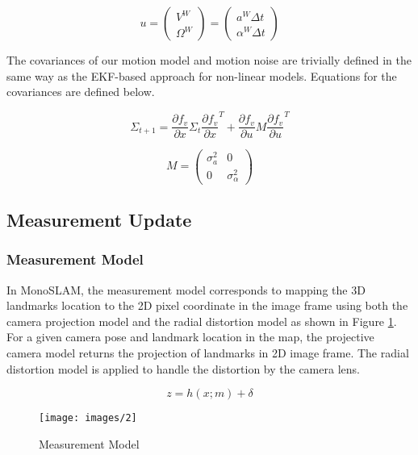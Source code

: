 \documentclass[conference]{IEEEtran}
\begin{document}
\begin{equation}
u = 
\begin{pmatrix}
V^{W} \\
\Omega^{W}
\end{pmatrix} = 
\begin{pmatrix}
a^{W}\Delta t \\
\alpha^{W}\Delta t
\end{pmatrix}
\end{equation}

The covariances of our motion model and motion noise are trivially defined in the same way as the EKF-based approach for non-linear models. Equations for the covariances are defined below.

\begin{equation}
\Sigma_{t+1} = \frac{\partial f_{v}}{\partial x}\Sigma_{t}\frac{\partial f_{v}}{\partial x}^{T} + \frac{\partial f_{v}}{\partial u}M\frac{\partial f_{v}}{\partial u}^{T}
\end{equation}

\begin{equation}
M = 
\begin{pmatrix}
\sigma_{a}^{2} & 0 \\
0 & \sigma_{\alpha}^2
\end{pmatrix}
\end{equation}


\subsection{Measurement Update}

\subsubsection{Measurement Model}
In MonoSLAM, the measurement model corresponds to mapping the 3D landmarks location to the 2D pixel coordinate in the image frame using both the camera projection model and the radial distortion model as shown in Figure \ref{fig:Measurement}. For a given camera pose and landmark location in the map, the projective camera model returns the projection of landmarks in 2D image frame. The radial distortion model is applied to handle the distortion by the camera lens.

\begin{equation}
z = h(x;m) + \delta
\end{equation}

\begin{figure}[h]
\centering
\texttt{[image: images/2]}
\caption{Measurement Model}
\label{fig:Measurement}
\end{figure}
\end{document}
